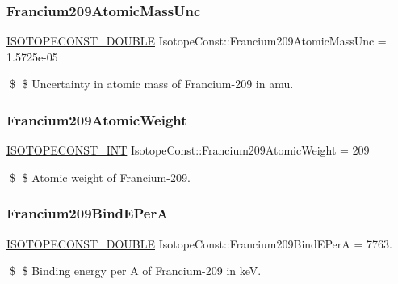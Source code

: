 \subsubsection{\texorpdfstring{Francium209\+Atomic\+Mass\+Unc}{Francium209AtomicMassUnc}}
{\footnotesize\ttfamily \mbox{\hyperlink{group___isotope_const-_macros_ga8f45a7272ce02c0b4c65c44636ed719a}{I\+S\+O\+T\+O\+P\+E\+C\+O\+N\+S\+T\+\_\+\+D\+O\+U\+B\+LE}} Isotope\+Const\+::\+Francium209\+Atomic\+Mass\+Unc = 1.\+5725e-\/05}

\$ \$ Uncertainty in atomic mass of Francium-\/209 in amu. \mbox{\label{group___isotope_const-_francium-_fr209_ga84ac2569f6d4e128136e7bf2ea6361ab}} 
\subsubsection{\texorpdfstring{Francium209\+Atomic\+Weight}{Francium209AtomicWeight}}
{\footnotesize\ttfamily \mbox{\hyperlink{group___isotope_const-_macros_ga5f18360b3e99483a35c32d789e62621c}{I\+S\+O\+T\+O\+P\+E\+C\+O\+N\+S\+T\+\_\+\+I\+NT}} Isotope\+Const\+::\+Francium209\+Atomic\+Weight = 209}

\$ \$ Atomic weight of Francium-\/209. \mbox{\label{group___isotope_const-_francium-_fr209_ga30cf844ed82d362c5bae97e239a30ecd}} 
\subsubsection{\texorpdfstring{Francium209\+Bind\+E\+PerA}{Francium209BindEPerA}}
{\footnotesize\ttfamily \mbox{\hyperlink{group___isotope_const-_macros_ga8f45a7272ce02c0b4c65c44636ed719a}{I\+S\+O\+T\+O\+P\+E\+C\+O\+N\+S\+T\+\_\+\+D\+O\+U\+B\+LE}} Isotope\+Const\+::\+Francium209\+Bind\+E\+PerA = 7763.}

\$ \$ Binding energy per A of Francium-\/209 in keV. \mbox{\label{group___isotope_const-_francium-_fr209_ga0dd43735907b766e09ddf06c84554c24}} 
